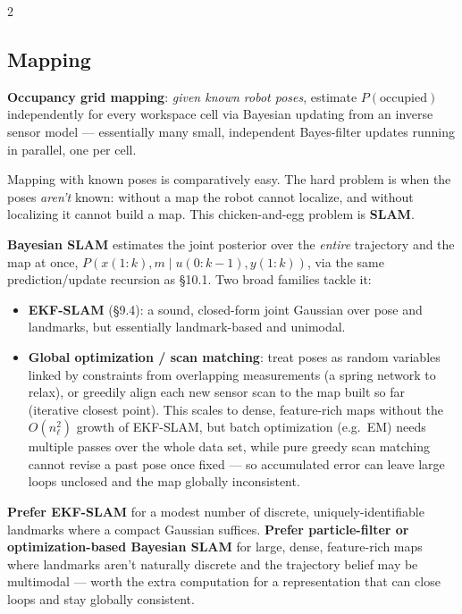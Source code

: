 \documentclass[10pt,a4paper]{article}
\newcommand{\keyterm}[1]{\textbf{#1}}
\begin{document}
\begin{multicols}{2}
\subsection{Mapping}
\keyterm{Occupancy grid mapping}: \emph{given known robot poses}, estimate $P(\text{occupied})$ independently for every workspace cell via Bayesian updating from an inverse sensor model --- essentially many small, independent Bayes-filter updates running in parallel, one per cell.
\begin{notebox}
Mapping with known poses is comparatively easy. The hard problem is when the poses \emph{aren't} known: without a map the robot cannot localize, and without localizing it cannot build a map. This chicken-and-egg problem is \keyterm{SLAM}.
\end{notebox}
\keyterm{Bayesian SLAM} estimates the joint posterior over the \emph{entire} trajectory and the map at once, $P(x(1{:}k),m\mid u(0{:}k{-}1),y(1{:}k))$, via the same prediction/update recursion as \S10.1. Two broad families tackle it:
\begin{itemize}
\item \keyterm{EKF-SLAM} (\S9.4): a sound, closed-form joint Gaussian over pose and landmarks, but essentially landmark-based and unimodal.
\item \keyterm{Global optimization / scan matching}: treat poses as random variables linked by constraints from overlapping measurements (a spring network to relax), or greedily align each new sensor scan to the map built so far (iterative closest point). This scales to dense, feature-rich maps without the $O(n_\ell^2)$ growth of EKF-SLAM, but batch optimization (e.g.\ EM) needs multiple passes over the whole data set, while pure greedy scan matching cannot revise a past pose once fixed --- so accumulated error can leave large loops unclosed and the map globally inconsistent.
\end{itemize}
\keyterm{Prefer EKF-SLAM} for a modest number of discrete, uniquely-identifiable landmarks where a compact Gaussian suffices. \keyterm{Prefer particle-filter or optimization-based Bayesian SLAM} for large, dense, feature-rich maps where landmarks aren't naturally discrete and the trajectory belief may be multimodal --- worth the extra computation for a representation that can close loops and stay globally consistent.

\end{multicols}
\end{document}
